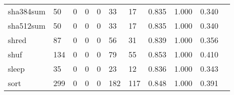\begin{longtable}{lp{1.2cm}p{1.2cm}p{1.2cm}p{1.2cm}p{1.2cm}p{1.2cm}p{1.2cm}p{1.2cm}p{1.2cm}p{1.2cm}}
sha384sum &                                    50 &                                                  0 &                                                  0 &                                                  0 &                                                 33 &                                                 17 &                                              0.835 &                                              1.000 &                                              0.340 \\
sha512sum &                                    50 &                                                  0 &                                                  0 &                                                  0 &                                                 33 &                                                 17 &                                              0.835 &                                              1.000 &                                              0.340 \\
shred     &                                    87 &                                                  0 &                                                  0 &                                                  0 &                                                 56 &                                                 31 &                                              0.839 &                                              1.000 &                                              0.356 \\
shuf      &                                   134 &                                                  0 &                                                  0 &                                                  0 &                                                 79 &                                                 55 &                                              0.853 &                                              1.000 &                                              0.410 \\
sleep     &                                    35 &                                                  0 &                                                  0 &                                                  0 &                                                 23 &                                                 12 &                                              0.836 &                                              1.000 &                                              0.343 \\
sort      &                                   299 &                                                  0 &                                                  0 &                                                  0 &                                                182 &                                                117 &                                              0.848 &                                              1.000 &                                              0.391 \\

\end{longtable}
